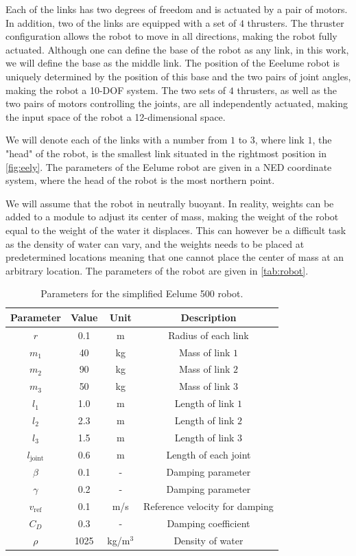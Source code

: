Each of the links has two degrees of freedom and is actuated by a pair of
motors. In addition, two of the links are equipped with a set of $4$ thrusters.
The thruster configuration allows the robot to move in all directions, making
the robot fully actuated. Although one can define the base of the robot as any
link, in this work, we will define the base as the middle link. The position of
the Eeelume robot is uniquely determined by the position of this base and the 
two pairs of joint angles, making the robot a 10-DOF system. The two sets of 
$4$ thrusters, as well as the two pairs of motors controlling the joints, are 
all independently actuated, making the input space of the robot a 
12-dimensional space.

We will denote each of the links with a number from $1$ to $3$, where link $1$,
the "head" of the robot, is the smallest link situated in the rightmost position
in \autoref{fig:eely}. The parameters of the Eelume robot are given in a
NED coordinate system, where the head of the robot is the most northern point.

We will assume that the robot in neutrally buoyant. In reality, weights can be
added to a module to adjust its center of mass, making the weight of the robot
equal to the weight of the water it displaces. This can however be a difficult
task as the density of water can vary, and the weights needs to be placed at 
predetermined locations meaning that one cannot place the center of mass at an
arbitrary location.
The parameters of the robot are given in \autoref{tab:robot}.

\begin{table}[h]
    \centering
    \begin{tabular}{|c|c|c|c|}
        \hline
        Parameter & Value & Unit & Description \\ \hline
        $r$ & 0.1 & m & Radius of each link \\
        $m_1$ & 40 & kg & Mass of link $1$ \\
        $m_2$ & 90 & kg & Mass of link $2$ \\
        $m_3$ & 50 & kg & Mass of link $3$ \\
        $l_1$ & 1.0 & m & Length of link $1$ \\
        $l_2$ & 2.3 & m & Length of link $2$ \\
        $l_3$ & 1.5 & m & Length of link $3$ \\
        $l_{\mathrm{joint}}$ & 0.6 & m & Length of each joint \\
        $\beta$ & 0.1 & - & Damping parameter \\
        $\gamma$ & 0.2 & - & Damping parameter \\
        $v_{\mathrm{ref}}$ & 0.1 & m/s & Reference velocity for damping \\
        $C_D$ & 0.3 & - & Damping coefficient \\
        $\rho$ & 1025 & kg/m$^3$ & Density of water \\
        \hline
    \end{tabular}
    \caption{Parameters for the simplified Eelume 500 robot.}
    \label{tab:robot}
\end{table}

